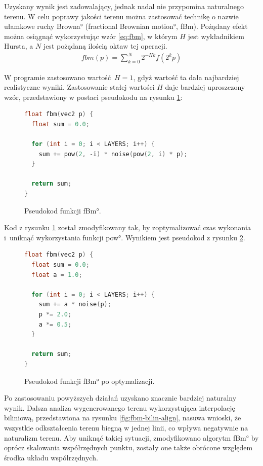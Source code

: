 Uzyskany wynik jest zadowalający, jednak nadal nie przypomina naturalnego terenu. W celu poprawy jakości terenu można zastosować technikę o nazwie \ang{ułamkowe ruchy Browna} (\ang{fractional Brownian motion}, fBm)\cite{bib:bookofshaders}\cite{bib:Musgrave2003ProceduralFT}. Pożądany efekt można osiągnąć wykorzystując wzór \ref{eq:fbm}\cite{bib:iqfbm}, w którym $H$ jest wykładnikiem Hursta, a $N$ jest pożądaną ilością oktaw tej operacji.
\begin{equation}
\label{eq:fbm}
  \begin{split}
    fbm(p) = \sum^N_{k = 0} 2^{-Hk}f(2^kp)
  \end{split}
\end{equation}

W programie zastosowano wartość $H = 1$, gdyż wartość ta dała najbardziej realistyczne wyniki.
Zastosowanie stałej wartości $H$ daje bardziej uproszczony wzór, przedstawiony w postaci pseudokodu na rysunku \ref{fig:pseudokod:fbm}:

\begin{figure}[H]
\centering
\begin{lstlisting}[language=C]
float fbm(vec2 p) {
  float sum = 0.0;

  for (int i = 0; i < LAYERS; i++) {
    sum += pow(2, -i) * noise(pow(2, i) * p);
  }

  return sum;
}
\end{lstlisting}
\caption{Pseudokod funkcji \ang{fBm}.}
\label{fig:pseudokod:fbm}
\end{figure}

Kod z rysunku \ref{fig:pseudokod:fbm} został zmodyfikowany tak, by zoptymalizować czas wykonania i~uniknąć wykorzystania funkcji \ang{pow}\cite{bib:glslpow}. Wynikiem jest pseudokod z rysunku \ref{fig:pseudokod:fbm-opt}.

\begin{figure}[H]
\centering
\begin{lstlisting}[language=C]
float fbm(vec2 p) {
  float sum = 0.0;
  float a = 1.0;

  for (int i = 0; i < LAYERS; i++) {
    sum += a * noise(p);
    p *= 2.0;
    a *= 0.5;
  }

  return sum;
}
\end{lstlisting}
\caption{Pseudokod funkcji \ang{fBm} po optymalizacji.}
\label{fig:pseudokod:fbm-opt}
\end{figure}

Po zastosowaniu powyższych działań uzyskano znacznie bardziej naturalny wynik. Dalsza analiza wygenerowanego terenu wykorzystująca interpolację biliniową, przedstawiona na rysunku \ref{fig:fbm-bilin-align}, nasuwa wnioski, że wszystkie odkształcenia terenu biegną w jednej linii, co wpływa negatywnie na naturalizm terenu. Aby uniknąć takiej sytuacji, zmodyfikowano algorytm \ang{fBm} by oprócz skalowania współrzędnych punktu, zostały one także obrócone względem środka układu współrzędnych.

